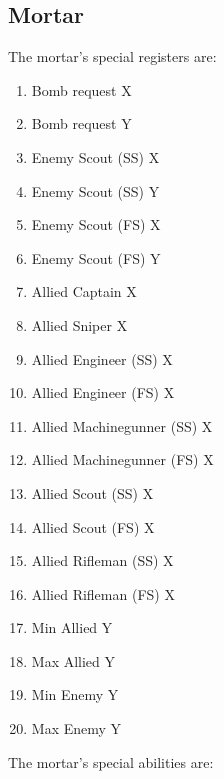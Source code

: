 \documentclass{article}
\begin{document}
\subsection*{Mortar}

The mortar's special registers are:

\begin{enumerate}[noitemsep]
    \item Bomb request X
    \item Bomb request Y
    \item Enemy Scout (SS) X
    \item Enemy Scout (SS) Y
    \item Enemy Scout (FS) X
    \item Enemy Scout (FS) Y
    \item Allied Captain X
    \item Allied Sniper X
    \item Allied Engineer (SS) X
    \item Allied Engineer (FS) X
    \item Allied Machinegunner (SS) X
    \item Allied Machinegunner (FS) X
    \item Allied Scout (SS) X
    \item Allied Scout (FS) X
    \item Allied Rifleman (SS) X
    \item Allied Rifleman (FS) X
    \item Min Allied Y
    \item Max Allied Y
    \item Min Enemy Y
    \item Max Enemy Y
\end{enumerate}

The mortar's special abilities are:
\end{document}
